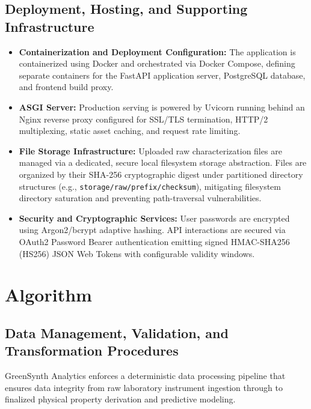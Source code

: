 \documentclass[12pt,a4paper,oneside]{report}
\begin{document}
{{{\subsection{Deployment, Hosting, and Supporting Infrastructure}

\begin{itemize}
    \item \textbf{Containerization and Deployment Configuration:} The application is containerized using Docker and orchestrated via Docker Compose, defining separate containers for the FastAPI application server, PostgreSQL database, and frontend build proxy.
    \item \textbf{ASGI Server:} Production serving is powered by Uvicorn running behind an Nginx reverse proxy configured for SSL/TLS termination, HTTP/2 multiplexing, static asset caching, and request rate limiting.
    \item \textbf{File Storage Infrastructure:} Uploaded raw characterization files are managed via a dedicated, secure local filesystem storage abstraction. Files are organized by their SHA-256 cryptographic digest under partitioned directory structures (e.g., \texttt{storage/raw/prefix/checksum}), mitigating filesystem directory saturation and preventing path-traversal vulnerabilities.
    \item \textbf{Security and Cryptographic Services:} User passwords are encrypted using Argon2/bcrypt adaptive hashing. API interactions are secured via OAuth2 Password Bearer authentication emitting signed HMAC-SHA256 (HS256) JSON Web Tokens with configurable validity windows.
\end{itemize}

\clearpage
\section{Algorithm}

\subsection{Data Management, Validation, and Transformation Procedures}

GreenSynth Analytics enforces a deterministic data processing pipeline that ensures data integrity from raw laboratory instrument ingestion through to finalized physical property derivation and predictive modeling.

}}}
\end{document}
